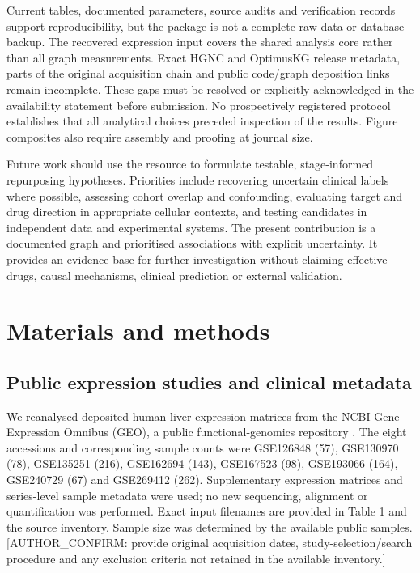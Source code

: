 \documentclass[11pt,a4paper]{article}
\begin{document}
Current tables, documented parameters, source audits and verification records support reproducibility, but the package is not a complete raw-data or database backup. The recovered expression input covers the shared analysis core rather than all graph measurements. Exact HGNC and OptimusKG release metadata, parts of the original acquisition chain and public code/graph deposition links remain incomplete. These gaps must be resolved or explicitly acknowledged in the availability statement before submission. No prospectively registered protocol establishes that all analytical choices preceded inspection of the results. Figure composites also require assembly and proofing at journal size.

Future work should use the resource to formulate testable, stage-informed repurposing hypotheses. Priorities include recovering uncertain clinical labels where possible, assessing cohort overlap and confounding, evaluating target and drug direction in appropriate cellular contexts, and testing candidates in independent data and experimental systems. The present contribution is a documented graph and prioritised associations with explicit uncertainty. It provides an evidence base for further investigation without claiming effective drugs, causal mechanisms, clinical prediction or external validation.

\section*{Materials and methods}
\subsection*{Public expression studies and clinical metadata}
We reanalysed deposited human liver expression matrices from the NCBI Gene Expression Omnibus (GEO), a public functional-genomics repository \cite{ref8}. The eight accessions and corresponding sample counts were GSE126848 (57), GSE130970 (78), GSE135251 (216), GSE162694 (143), GSE167523 (98), GSE193066 (164), GSE240729 (67) and GSE269412 (262). Supplementary expression matrices and series-level sample metadata were used; no new sequencing, alignment or quantification was performed. Exact input filenames are provided in Table 1 and the source inventory. Sample size was determined by the available public samples. [AUTHOR\_CONFIRM: provide original acquisition dates, study-selection/search procedure and any exclusion criteria not retained in the available inventory.]
\end{document}
